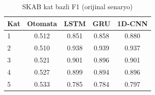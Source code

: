 \begin{table}[h]
\centering
\caption{SKAB kat bazli F1 (orijinal senaryo)}
\begin{tabular}{lcccc}
\hline
Kat & Otomata & LSTM & GRU & 1D-CNN \\
\hline
1 & 0.512 & 0.851 & 0.858 & 0.880 \\
2 & 0.510 & 0.938 & 0.939 & 0.937 \\
3 & 0.521 & 0.901 & 0.896 & 0.901 \\
4 & 0.527 & 0.899 & 0.894 & 0.896 \\
5 & 0.533 & 0.785 & 0.784 & 0.797 \\
\hline
\end{tabular}
\end{table}
